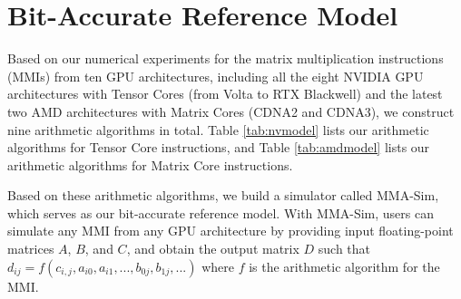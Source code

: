 \section{Bit-Accurate Reference Model}
\label{sec:model}

Based on our numerical experiments for the matrix multiplication instructions (MMIs) from ten GPU architectures, including all the eight NVIDIA GPU architectures with Tensor Cores (from Volta to RTX Blackwell) and the latest two AMD architectures with Matrix Cores (CDNA2 and CDNA3), we construct nine arithmetic algorithms in total. Table \ref{tab:nvmodel} lists our arithmetic algorithms for Tensor Core instructions, and Table \ref{tab:amdmodel} lists our arithmetic algorithms for Matrix Core instructions.

Based on these arithmetic algorithms, we build a simulator called MMA-Sim, which serves as our bit-accurate reference model. With MMA-Sim, users can simulate any MMI from any GPU architecture by providing input floating-point matrices $A$, $B$, and $C$, and obtain the output matrix $D$ such that $d_{ij}=f(c_{i,j}, a_{i0}, a_{i1}, ..., b_{0j}, b_{1j}, ...)$ where $f$ is the arithmetic algorithm for the MMI.

